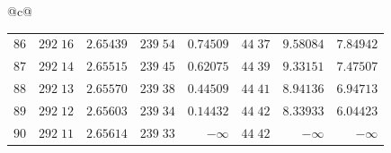 \begin{center}
{\begin{tabular}{@{}c@{}}
\begin{tabular}{r|r|r|r|r|r|r|r}
$86$&$292\;16$&$2.65439$&$239\;54$&$0.74509$&$44\;37$&$9.58084$&$7.84942$\\
$87$&$292\;14$&$2.65515$&$239\;45$&$0.62075$&$44\;39$&$9.33151$&$7.47507$\\
$88$&$292\;13$&$2.65570$&$239\;38$&$0.44509$&$44\;41$&$8.94136$&$6.94713$\\
$89$&$292\;12$&$2.65603$&$239\;34$&$0.14432$&$44\;42$&$8.33933$&$6.04423$\\[2pt]
$90$&$292\;11$&$2.65614$&$239\;33$&$-\infty$&$44\;42$&$-\infty$&$-\infty$\\
\end{tabular}
\end{tabular}%
}
\end{center}
\endgroup
\clearpage
{}
\begingroup
\fontsize{9}{10.2}\selectfont
\setlength{\tabcolsep}{1.5pt}
\renewcommand{\arraystretch}{1.02}
